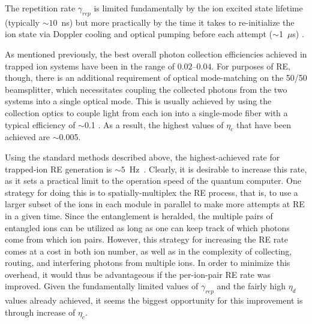 \documentclass[%
reprint,
 amsmath,amssymb,
]{revtex4-1}
\begin{document}
The repetition rate $\gamma_{rep}$ is limited fundamentally by the ion excited state lifetime (typically ${\sim}10$~ns) but more practically by the time it takes to re-initialize the ion state via Doppler cooling and optical pumping before each attempt ($\sim$1~$\mu$s) \cite{HuculModEntanglement2014}.

As mentioned previously, the best overall photon collection efficiencies achieved in trapped ion systems have been in the range of $0.02$--$0.04$. For purposes of RE, though, there is an additional requirement of optical mode-matching on the 50/50 beamsplitter, which necessitates coupling the collected photons from the two systems into a single optical mode. This is usually achieved by using the collection optics to couple light from each ion into a single-mode fiber with a typical efficiency of $\sim$0.1 \cite{HuculModEntanglement2014}.  As a result, the highest values of $\eta_{c}$ that have been achieved are $\sim$0.005.

Using the standard methods described above, the highest-achieved rate for trapped-ion RE generation is ${\sim}5$~Hz~\cite{HuculModEntanglement2014}.  Clearly, it is desirable to increase this rate, as it sets a practical limit to the operation speed of the quantum computer.  One strategy for doing this is to spatially-multiplex the RE process, that is, to use a larger subset of the ions in each module in parallel to make more attempts at RE in a given time.  Since the entanglement is heralded, the multiple pairs of entangled ions can be utilized as long as one can keep track of which photons come from which ion pairs.  However, this strategy for increasing the RE rate comes at a cost in both ion number, as well as in the complexity of collecting, routing, and interfering photons from multiple ions.  In order to minimize this overhead, it would thus be advantageous if the per-ion-pair RE rate was improved.  Given the fundamentally limited values of $\gamma_{rep}$ and the fairly high $\eta_{d}$ values already achieved,  it seems the biggest opportunity for this improvement is through increase of $\eta_{c}$.
\end{document}
